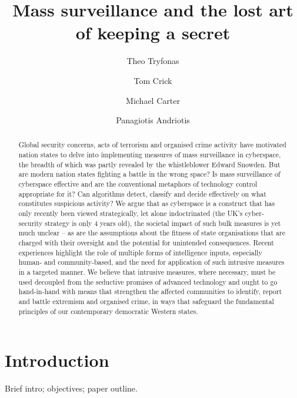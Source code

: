 \documentclass{llncs}
\begin{document}
\title{Mass surveillance and the lost art of keeping a secret}

\author{Theo Tryfonas \and Tom Crick \and Michael Carter \and Panagiotis Andriotis}

\maketitle

\begin{abstract}
Global security concerns, acts of terrorism and organised crime activity have motivated nation states to delve into implementing measures of mass surveillance in cyberspace, the breadth of which was partly revealed by the whistleblower Edward Snowden. But are modern nation states fighting a battle in the wrong space? Is mass surveillance of cyberspace effective and are the conventional metaphors of technology control appropriate for it? Can algorithms detect, classify and decide effectively on what constitutes suspicious activity? We argue that as cyberspace is a construct that has only recently been viewed strategically, let alone indoctrinated (the UK’s cyber-security strategy is only 4 years old), the societal impact of such bulk measures is yet much unclear – as are the assumptions about the fitness of state organisations that are charged with their oversight and the potential for unintended consequences. Recent experiences highlight the role of multiple forms of intelligence inputs, especially human- and community-based, and the need for application of such intrusive measures in a targeted manner. We believe that intrusive measures, where necessary, must be used decoupled from the seductive promises of advanced technology and ought to go hand-in-hand with means that strengthen the affected communities to identify, report and battle extremism and organised crime, in ways that safeguard the fundamental principles of our contemporary democratic Western states. 
\end{abstract}

\section{Introduction}
\label{sec:Introduction}
Brief intro; objectives; paper outline.
\end{document}
